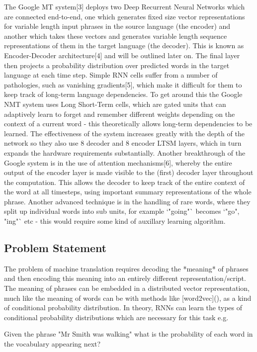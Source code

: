 \documentclass[]{article}
\begin{document}
The Google MT system[3] deploys two Deep Recurrent Neural Networks which are connected end-to-end, one which generates fixed size vector representations for variable length input phrases in the source language (the encoder) and another which takes these vectors and generates variable length sequence representations of them in the target language (the decoder). This is known as Encoder-Decoder architecture[4] and will be outlined later on. The final layer then projects a probability distribution over predicted words in the target language at each time step. Simple RNN cells suffer from a number of pathologies, such as vanishing gradients[5], which make it difficult for them to keep track of long-term language dependencies. To get around this the Google NMT system uses Long Short-Term cells, which are gated units that can adaptively learn to forget and remember different weights depending on the context of a current word - this theoretically allows long-term dependencies to be learned. The effectiveness of the system increases greatly with the depth of the network so they also use 8 decoder and 8 encoder LTSM layers, which in turn expands the hardware requirements substantially. Another breakthrough of the Google system is in the use of attention mechanisms[6], whereby the entire output of the encoder layer is made visible to the (first) decoder layer throughout the computation. This allows the decoder to keep track of the entire context of the word at all timesteps, using important summary representations of the whole phrase. Another advanced technique is in the handling of rare words, where they split up individual words into sub units, for example `"going"` becomes `"go", "ing"` etc - this would require some kind of auxillary learning algorithm. 
\subsection{Problem Statement}
The problem of machine translation requires decoding the *meaning* of phrases and then encoding this meaning into an entirely different representation/script. The meaning of phrases can be embedded in a distributed vector representation, much like the meaning of words can be with methods like [word2vec](), as a kind of conditional probability distribution. In theory, RNNs can learn the types of conditional probability distributions which are necessary for this task e.g.

Given the phrase "Mr Smith was walking" what is the probability
of each word in the vocabulary appearing next?
\end{document}
